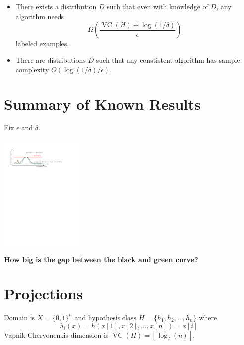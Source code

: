 \documentclass[30pt,landscape]{sciposter}
\DeclareMathOperator{\VC}{VC}
\begin{document}
\begin{multicols}{3}
\begin{itemize}
\vspace{1cm}

\item There exists a distribution $D$ such that even with knowledge of $D$,
any algorithm needs
$$
\Omega \left( \frac{\VC(H) + \log(1/\delta)}{\epsilon} \right)
$$
labeled examples.

\vspace{1cm}

\item There are distributions $D$ such that any constistent algorithm
has sample complexity $O(\log(1/\delta)/\epsilon)$.
\end{itemize}

\columnbreak

\section*{Summary of Known Results}

Fix $\epsilon$ and $\delta$.

\vspace{1cm}

\begin{center}
\includegraphics[width=0.3\textwidth]{figure-1}
\end{center}

\textbf{How big is the gap between the black and green curve?}

\section*{Projections}

Domain is $X = \{0,1\}^n$ and hypothesis class $H = \{h_1, h_2, \dots, h_n\}$
where
$$
h_i(x) = h(x[1], x[2], \dots, x[n]) = x[i]
$$
Vapnik-Chervonenkis dimension is $\VC(H) = \left \lfloor \log_2(n) \right \rfloor$.

\vspace{1cm}


\end{multicols}
\end{document}
